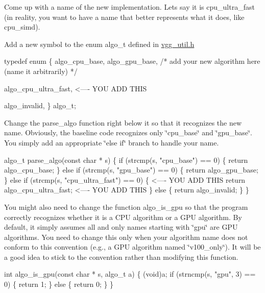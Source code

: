 \begin{DoxyItemize}
\item Come up with a name of the new implementation. Let\textquotesingle{}s say it is cpu\+\_\+ultra\+\_\+fast (in reality, you want to have a name that better represents what it does, like cpu\+\_\+simd).
\item Add a new symbol to the enum algo\+\_\+t defined in \hyperlink{vgg__util_8h}{vgg\+\_\+util.\+h} 
\begin{DoxyCode}
typedef enum \{
  algo\_cpu\_base,
  algo\_gpu\_base,
  /* add your new algorithm here (name it arbitrarily) */

  algo\_cpu\_ultra\_fast, <----  YOU ADD THIS

  algo\_invalid,
\} algo\_t;
\end{DoxyCode}

\item Change the parse\+\_\+algo function right below it so that it recognizes the new name. Obviously, the baseline code recognizes only \char`\"{}cpu\+\_\+base\char`\"{} and \char`\"{}gpu\+\_\+base\char`\"{}. You simply add an appropriate \char`\"{}else if\char`\"{} branch to handle your name.
\end{DoxyItemize}


\begin{DoxyCode}
algo\_t parse\_algo(const char * s) \{
  if (strcmp(s, "cpu\_base") == 0) \{
    return algo\_cpu\_base;
  \} else if (strcmp(s, "gpu\_base") == 0) \{
    return algo\_gpu\_base;
  \} else if (strcmp(s, "cpu\_ultra\_fast") == 0) \{  <---- YOU ADD THIS
    return algo\_cpu\_ultra\_fast;                   <---- YOU ADD THIS
  \} else \{
    return algo\_invalid;
  \}
\}
\end{DoxyCode}



\begin{DoxyItemize}
\item You might also need to change the function algo\+\_\+is\+\_\+gpu so that the program correctly recognizes whether it is a C\+PU algorithm or a G\+PU algorithm. By default, it simply assumes all and only names starting with \char`\"{}gpu\char`\"{} are G\+PU algorithms. You need to change this only when your algorithm name does not conform to this convention (e.\+g., a G\+PU algorithm named \char`\"{}v100\+\_\+only\char`\"{}). It will be a good idea to stick to the convention rather than modifying this function.
\end{DoxyItemize}


\begin{DoxyCode}
int algo\_is\_gpu(const char * s, algo\_t a) \{
  (void)a;
  if (strncmp(s, "gpu", 3) == 0) \{
    return 1;
  \} else \{ 
    return 0;
  \}
\}
\end{DoxyCode}


